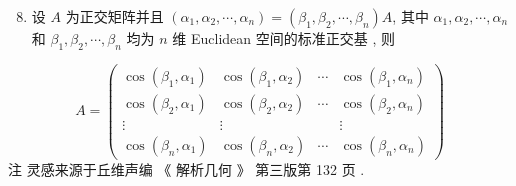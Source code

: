 \documentclass[10pt]{article}
\begin{document}
\begin{enumerate}
  \setcounter{enumi}{7}
  \item  设  $A$  为正交矩阵并且  $\left(\alpha_{1}, \alpha_{2}, \cdots, \alpha_{n}\right)=\left(\beta_{1}, \beta_{2}, \cdots, \beta_{n}\right) A$,  其中  $\alpha_{1}, \alpha_{2}, \cdots, \alpha_{n}$  和  $\beta_{1}, \beta_{2}, \cdots, \beta_{n}$  均为  $n$  维  Euclidean  空间的标准正交基 ,  则 
\end{enumerate}
$$
A=\left(\begin{array}{cccc}
\cos \left(\beta_{1}, \alpha_{1}\right) & \cos \left(\beta_{1}, \alpha_{2}\right) & \cdots & \cos \left(\beta_{1}, \alpha_{n}\right) \\
\cos \left(\beta_{2}, \alpha_{1}\right) & \cos \left(\beta_{2}, \alpha_{2}\right) & \cdots & \cos \left(\beta_{2}, \alpha_{n}\right) \\
\vdots & \vdots & & \vdots \\
\cos \left(\beta_{n}, \alpha_{1}\right) & \cos \left(\beta_{n}, \alpha_{2}\right) & \cdots & \cos \left(\beta_{n}, \alpha_{n}\right)
\end{array}\right)
$$
 注   灵感来源于丘维声编 《 解析几何 》 第三版第  132  页 .
\end{document}
